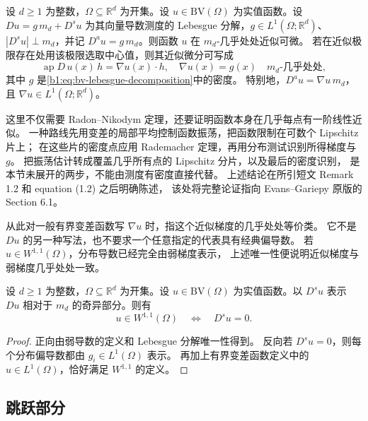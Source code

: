 \begin{theorem}
\label{b1:thm:bv-approximate-gradient}
设 \(d\ge1\) 为整数，\(\Omega\subseteq\mathbb R^d\) 为开集。设 \(u\in\mathrm{BV}(\Omega)\) 为实值函数。设 \(Du=g\,m_d+D^su\) 为其向量导数测度的 Lebesgue 分解，\(g\in L^1(\Omega;\mathbb R^d)\)、\(|D^su|\perp m_d\)，并记 \(D^au=g\,m_d\)。则函数 \(u\) 在 \(m_d\)-几乎处处近似可微。
若在近似极限存在处用该极限选取中心值，则其近似微分可写成
\[
 \operatorname{ap}D\,u(x)\,h=\nabla u(x)\cdot h,
 \quad \nabla u(x)=g(x)
 \quad m_d\text{-几乎处处},
\]
其中 \(g\) 是\eqref{b1:eq:bv-lebesgue-decomposition}中的密度。
特别地，\(D^au=\nabla u\,m_d\)，且 \(\nabla u\in L^1(\Omega;\mathbb R^d)\)。
\end{theorem}
\begin{proofsketch}
这里不仅需要 Radon--Nikodym 定理，还要证明函数本身在几乎每点有一阶线性近似。
一种路线先用变差的局部平均控制函数振荡，把函数限制在可数个 Lipschitz 片上；
在这些片的密度点应用 Rademacher 定理，再用分布测试识别所得梯度与 \(g\)。
把振荡估计转成覆盖几乎所有点的 Lipschitz 分片，以及最后的密度识别，
是本节未展开的两步，不能由测度有密度直接代替。
上述结论在所引短文 Remark 1.2 和 equation (1.2) 之后明确陈述，
该处将完整论证指向 Evans--Gariepy 原版的 Section 6.1。
\end{proofsketch}

从此对一般有界变差函数写 \(\nabla u\) 时，指这个近似梯度的几乎处处等价类。
它不是 \(Du\) 的另一种写法，也不要求一个任意指定的代表具有经典偏导数。
若 \(u\in W^{1,1}(\Omega)\)，分布导数已经完全由弱梯度表示，
上述唯一性便说明近似梯度与弱梯度几乎处处一致。

\begin{proposition}\label{b1:prop:bv-sobolev-singular-criterion}
设 \(d\ge1\) 为整数，\(\Omega\subseteq\mathbb R^d\) 为开集。设 \(u\in\mathrm{BV}(\Omega)\) 为实值函数。以 \(D^su\) 表示 \(Du\) 相对于 \(m_d\) 的奇异部分。则有
\[
 u\in W^{1,1}(\Omega)\quad\Longleftrightarrow\quad D^su=0.
\]
\end{proposition}
\begin{proof}
正向由弱导数的定义和 Lebesgue 分解唯一性得到。
反向若 \(D^su=0\)，则每个分布偏导数都由 \(g_i\in L^1(\Omega)\) 表示。
再加上有界变差函数定义中的 \(u\in L^1(\Omega)\)，恰好满足 \(W^{1,1}\) 的定义。
\end{proof}

\subsection{跳跃部分}
\label{b1:subsec:280302}

